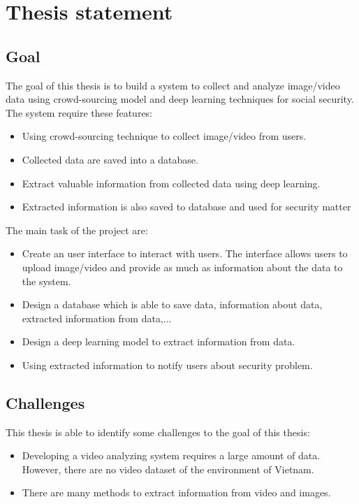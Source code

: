 \section{Thesis statement}
\subsection{Goal}
The goal of this thesis is to build a system to collect and analyze image/video data using crowd-sourcing model and deep learning techniques for social security. The system require these features:
\begin{itemize}
	\item Using crowd-sourcing technique to collect image/video from users.
	\item Collected data are saved into a database.
	\item Extract valuable information from collected data using deep learning.
	\item Extracted information is also saved to database and used for security matter
\end{itemize} 
The main task of the project are:
\begin{itemize}
	\item Create an user interface to interact with users. The interface allows users to upload image/video and provide as much as information about the data to the system.
	\item Design a database which is able to save data, information about data, extracted information from data,...
	\item Design a deep learning model to extract information from data.
	\item Using extracted information to notify users about security problem.
\end{itemize} 
\subsection{Challenges}
This thesis is able to identify some challenges to the goal of this thesis:
\begin{itemize}
	\item Developing a video analyzing system requires a large amount of data. However, there are no video dataset of the environment of Vietnam.
	\item There are many methods to extract information from video and images.
\end{itemize}
